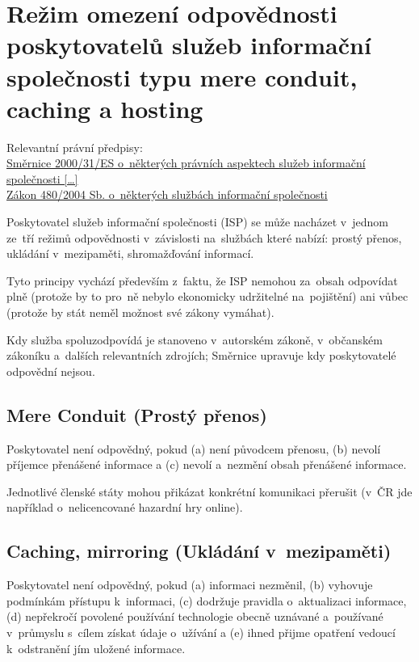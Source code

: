 \section{Režim omezení odpovědnosti poskytovatelů služeb informační společnosti typu mere conduit, caching a hosting}

{}Relevantní právní předpisy:
\\\href{https://eur-lex.europa.eu/legal-content/CS/ALL/?uri=CELEX:32000L0031
}{Směrnice 2000/31/ES o~některých právních aspektech služeb informační společnosti [\dots]}
\\\href{https://www.zakonyprolidi.cz/cs/2004-480}{Zákon 480/2004 Sb. o~některých službách informační společnosti}

Poskytovatel služeb informační společnosti (ISP) se může nacházet v~jednom ze~tří režimů odpovědnosti v~závislosti na~službách které nabízí: prostý přenos, ukládání v~mezipaměti, shromažďování informací.

Tyto principy vychází především z~faktu, že ISP nemohou za~obsah odpovídat plně (protože by to pro~ně nebylo ekonomicky udržitelné na~pojištění) ani vůbec (protože by stát neměl možnost své zákony vymáhat).

Kdy služba spoluzodpovídá je stanoveno v~autorském zákoně, v~občanském zákoníku a~dalších relevantních zdrojích; Směrnice upravuje kdy poskytovatelé odpovědní nejsou.

\subsection{Mere Conduit (Prostý přenos)}

Poskytovatel není odpovědný, pokud
(a) není původcem přenosu,
(b) nevolí příjemce přenášené informace a
(c) nevolí a~nezmění obsah přenášené informace.

Jednotlivé členské státy mohou přikázat konkrétní komunikaci přerušit (v~ČR jde například o~nelicencované hazardní hry online).

\subsection{Caching, mirroring (Ukládání v~mezipaměti)}

Poskytovatel není odpovědný, pokud
(a) informaci nezměnil,
(b) vyhovuje podmínkám přístupu k~informaci,
(c) dodržuje pravidla o~aktualizaci informace,
(d) nepřekročí povolené používání technologie obecně uznávané a~používané v~průmyslu s~cílem získat údaje o~užívání a
(e) ihned přijme opatření vedoucí k~odstranění jím uložené informace.

